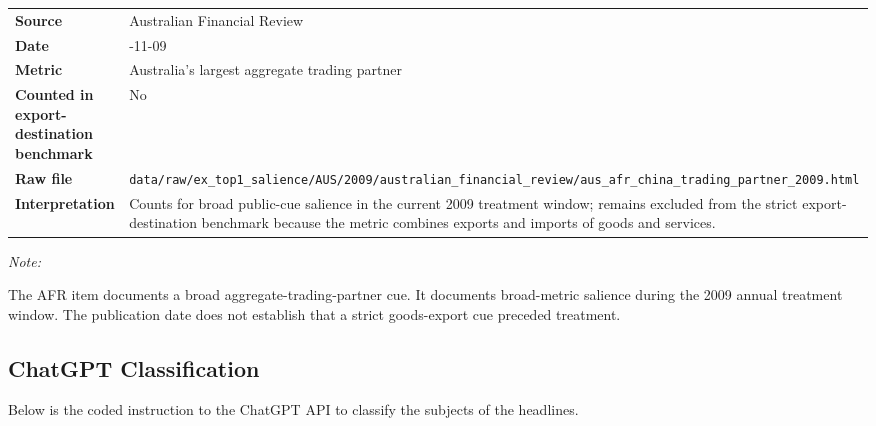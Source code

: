 \documentclass[referee,pdflatex,sn-basic]{sn-jnl}
\renewenvironment{table}[1][]{\tableorg[#1]}{\endtableorg\normalfont}
\theoremstyle{thmstylethree}
\begin{document}
\begin{table}[H]
\centering
\caption{\label{tab:ex-top1-australia-afr-context}Australian Financial Review context source for Australia.}
\centering
\fontsize{9}{11}\selectfont
\begin{threeparttable}
\begin{tabular}[t]{>{\raggedright\arraybackslash}p{4.6cm}>{\raggedright\arraybackslash}p{10.0cm}}
\toprule
\textbf{Source} & Australian Financial Review\\
\textbf{Date} & 2009-11-09\\
\textbf{Metric} & Australia's largest aggregate trading partner\\
\textbf{Counted in export-destination benchmark} & No\\
\textbf{Raw file} & \texttt{data/\allowbreak{}raw/\allowbreak{}ex\_top1\_salience/\allowbreak{}AUS/\allowbreak{}2009/\allowbreak{}australian\_financial\_review/\allowbreak{}aus\_afr\_china\_trading\_partner\_2009.html}\\
\textbf{Interpretation} & Counts for broad public-cue salience in the current 2009 treatment window; remains excluded from the strict export-destination benchmark because the metric combines exports and imports of goods and services.\\
\bottomrule
\end{tabular}
\begin{tablenotes}
\item \textit{Note: } 
\item The AFR item documents a broad aggregate-trading-partner cue. It documents broad-metric salience during the 2009 annual treatment window. The publication date does not establish that a strict goods-export cue preceded treatment.
\end{tablenotes}
\end{threeparttable}
\end{table}

\clearpage

\clearpage

\subsection*{ChatGPT Classification}\label{chatgpt-classification}

Below is the coded instruction to the ChatGPT API to classify the subjects of the headlines.

\begingroup\singlespacing
\end{document}
